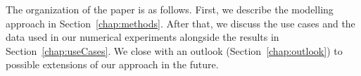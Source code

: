 The organization of the paper is as follows. First, we describe the modelling approach in Section~\ref{chap:methods}. After that, we discuss the use cases and the data used in our numerical experiments alongside the results in Section~\ref{chap:useCases}. We close with an outlook (Section~\ref{chap:outlook}) to possible extensions of our approach in the future.